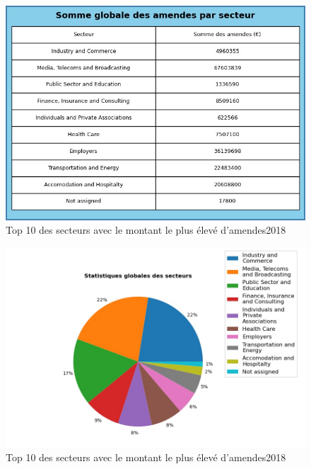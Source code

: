 \documentclass[french]{article}
\begin{document}
		
	\begin{multicols}{2}
	\begin{figure}
		[H]\centering\includegraphics[width=1.0\linewidth]{graphs/sector_data_year_fines}
		\caption{Top 10 des secteurs avec le montant le plus élevé d'amendes2018}
	\end{figure}
	\begin{figure}
		[H]\centering\includegraphics[width=1\linewidth]{graphs/sector_data_year}
		\caption{Top 10 des secteurs avec le montant le plus élevé d'amendes2018}
	 \end{figure}
	
	\end{multicols}
\end{document}
